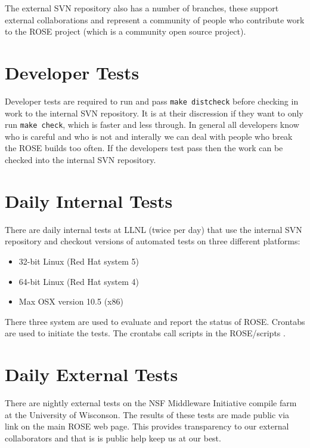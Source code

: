    The external SVN repository also has a number of branches, these support
external collaborations and represent a community of people who contribute
work to the ROSE project (which is a community open source project).


\section{Developer Tests}
\label{testing::developerTests}
   Developer tests are required to run and pass {\tt make distcheck}
before checking in work to the internal SVN repository.  It is at
their discression if they want to only run {\tt make check}, which is
faster and less through. In general all developers know who is careful and
who is not and interally we can deal with people who break the ROSE 
builds too often.  If the developers test pass then the work
can be checked into the internal SVN repository.

\section{Daily Internal Tests}
\label{testing::dailyInternalTests}
   There are daily internal tests at LLNL (twice per day)
that use the internal SVN repository and checkout versions
of automated tests on three different platforms:
\begin{itemize}
   \item 32-bit Linux (Red Hat system 5)
   \item 64-bit Linux (Red Hat system 4)
   \item Max OSX version 10.5 (x86)
\end{itemize}
There three system are used to evaluate and report the status of ROSE.  Crontabs are used
to initiate the tests.  The crontabs call scripts in the ROSE/scripts
.


\section{Daily External Tests}
\label{testing::dailyExternalTests}
   There are nightly external tests on the NSF Middleware Initiative compile farm
at the University of Wisconson. The results of these tests are made public
via link on the main ROSE web page.  This provides transparency to our external
collaborators and that is is public help keep us at our best.




